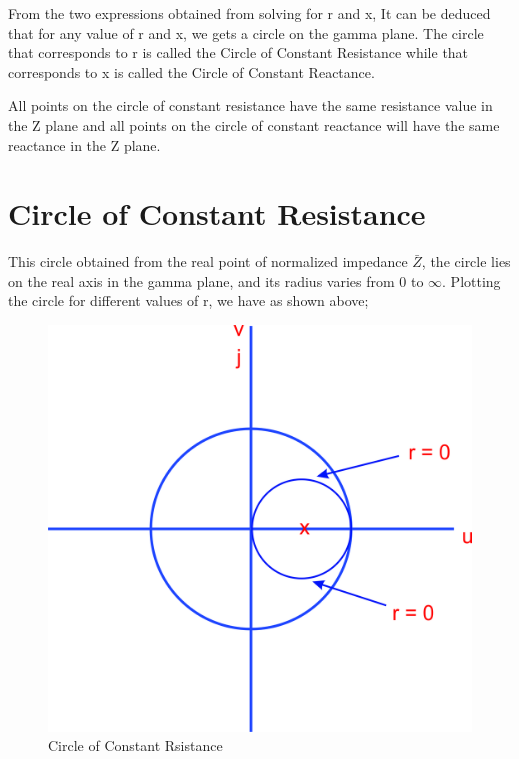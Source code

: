 From the two expressions obtained from solving for r and x,  It can be deduced that for any value of r and x, we gets a circle on the gamma plane. The circle that corresponds to r is called the Circle of Constant Resistance while that corresponds to x is called the Circle of Constant Reactance.

All points on the circle of constant resistance have the same resistance value in the Z plane and all points on the circle of constant reactance will have the same reactance in the Z plane.

\section{Circle of Constant Resistance}
This circle  obtained from the real point of normalized impedance $ \bar{Z} $, the circle lies on the real axis in the gamma plane, and its radius varies from 0 to $\infty$. Plotting the circle for different values of r, we have as shown above;
\begin{figure}[h]
\centering
\includegraphics[width=0.5\linewidth]{./graphics/ouytre}
\caption{Circle of Constant Rsistance}
\label{fig:ouytre}
\end{figure}

